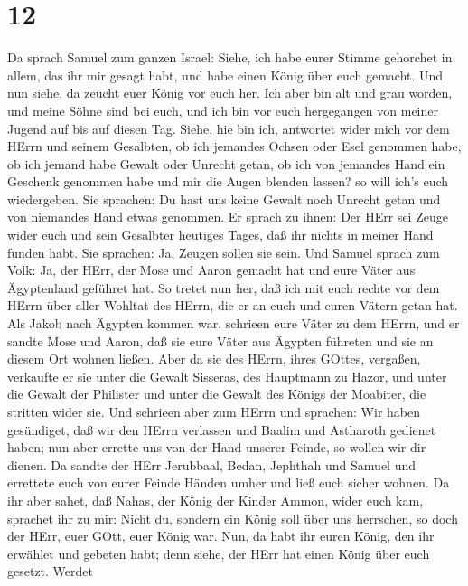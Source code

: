 \hypertarget{section-11}{%
\section{12}\label{section-11}}

 Da sprach Samuel zum ganzen Israel: Siehe, ich habe eurer
Stimme gehorchet in allem, das ihr mir gesagt habt, und habe einen König
über euch gemacht.  Und nun siehe, da zeucht euer König vor
euch her. Ich aber bin alt und grau worden, und meine Söhne sind bei
euch, und ich bin vor euch hergegangen von meiner Jugend auf bis auf
diesen Tag.  Siehe, hie bin ich, antwortet wider mich vor
dem HErrn und seinem Gesalbten, ob ich jemandes Ochsen oder Esel
genommen habe, ob ich jemand habe Gewalt oder Unrecht getan, ob ich von
jemandes Hand ein Geschenk genommen habe und mir die Augen blenden
lassen? so will ich's euch wiedergeben.  Sie sprachen: Du
hast uns keine Gewalt noch Unrecht getan und von niemandes Hand etwas
genommen.  Er sprach zu ihnen: Der HErr sei Zeuge wider euch
und sein Gesalbter heutiges Tages, daß ihr nichts in meiner Hand funden
habt. Sie sprachen: Ja, Zeugen sollen sie sein.  Und Samuel
sprach zum Volk: Ja, der HErr, der Mose und Aaron gemacht hat und eure
Väter aus Ägyptenland geführet hat.  So tretet nun her, daß
ich mit euch rechte vor dem HErrn über aller Wohltat des HErrn, die er
an euch und euren Vätern getan hat.  Als Jakob nach Ägypten
kommen war, schrieen eure Väter zu dem HErrn, und er sandte Mose und
Aaron, daß sie eure Väter aus Ägypten führeten und sie an diesem Ort
wohnen ließen.  Aber da sie des HErrn, ihres GOttes,
vergaßen, verkaufte er sie unter die Gewalt Sisseras, des Hauptmann zu
Hazor, und unter die Gewalt der Philister und unter die Gewalt des
Königs der Moabiter, die stritten wider sie.  Und schrieen
aber zum HErrn und sprachen: Wir haben gesündiget, daß wir den HErrn
verlassen und Baalim und Astharoth gedienet haben; nun aber errette uns
von der Hand unserer Feinde, so wollen wir dir dienen.  Da
sandte der HErr Jerubbaal, Bedan, Jephthah und Samuel und errettete euch
von eurer Feinde Händen umher und ließ euch sicher wohnen. 
Da ihr aber sahet, daß Nahas, der König der Kinder Ammon, wider euch
kam, sprachet ihr zu mir: Nicht du, sondern ein König soll über uns
herrschen, so doch der HErr, euer GOtt, euer König war. 
Nun, da habt ihr euren König, den ihr erwählet und gebeten habt; denn
siehe, der HErr hat einen König über euch gesetzt.  Werdet
